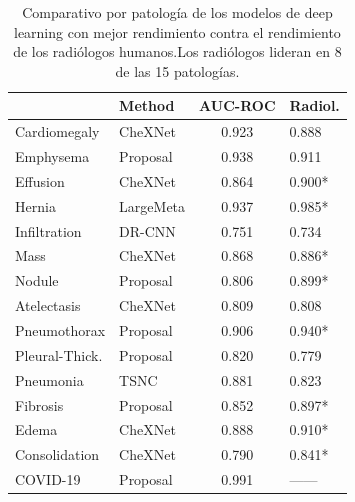 \begin{table}[tb]
    \centering
    \begin{tabular}{|l||l|c|l|}
        \hline
                        &	Method	&	AUC-ROC	& Radiol.	\\
        \hline\hline
        Cardiomegaly	&	CheXNet	    & 0.923 &   0.888	\\
        Emphysema	    &	Proposal    & 0.938	&   0.911	\\
        Effusion	    &	CheXNet	    & 0.864 &   0.900*	\\
        Hernia	        &	LargeMeta   & 0.937	&   0.985*	\\
        Infiltration	&	DR-CNN	    & 0.751 &	0.734	\\
        Mass	        &	CheXNet	    & 0.868	&	0.886*	\\
        Nodule	        &	Proposal    & 0.806	&	0.899*	\\
        Atelectasis	    &	CheXNet	    & 0.809 &	0.808	\\
        Pneumothorax	&	Proposal    & 0.906 &	0.940*	\\
        Pleural-Thick.	&	Proposal    & 0.820	&	0.779	\\
        Pneumonia	    &	TSNC	    & 0.881 &	0.823	\\
        Fibrosis	    &	Proposal    & 0.852 &	0.897*	\\
        Edema	        &	CheXNet	    & 0.888 &	0.910*	\\
        Consolidation	&	CheXNet	    & 0.790 &	0.841*	\\
        COVID-19	    &	Proposal    & 0.991 &	------	\\
        \hline
    \end{tabular}
    \caption{Comparativo por patología de los modelos de deep learning con mejor rendimiento contra
             el rendimiento de los radiólogos humanos.Los radiólogos lideran en 8 de las 15
             patologías.}
    \label{table_dl_human}
\end{table}


